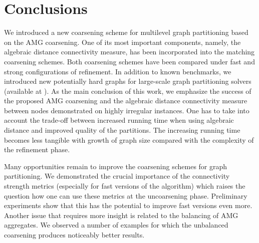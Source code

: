 \documentclass{llncs}
\begin{document}
\section{Conclusions}
We introduced a new coarsening scheme for multilevel graph partitioning based on the AMG coarsening.
One of its most important components, namely, the algebraic distance connectivity measure, has been incorporated into the matching coarsening schemes. 
Both coarsening schemes have been compared under fast and strong configurations of refinement. In addition to known benchmarks, we introduced new potentially hard graphs for large-scale graph partitioning solvers (available at \cite{dimacs10}).
As the main conclusion of this work, we emphasize the success of the proposed AMG coarsening and the algebraic distance connectivity measure between nodes demonstrated on highly irregular instances. One has to take into account the trade-off between increased running time when using algebraic distance and improved quality of the partitions. The increasing running time becomes less tangible with growth of graph size compared with the complexity of the refinement phase.  

Many opportunities remain to improve the coarsening schemes for graph partitioning. We demonstrated the crucial importance of the connectivity strength metrics (especially for fast versions of the algorithm) which raises the question how one can use these metrics at the uncoarsening phase. Preliminary experiments show that this has the potential to improve fast versions even more. 
Another issue that requires more insight is related to the balancing of AMG aggregates. We observed a number of examples for which the unbalanced coarsening produces noticeably better results.

\vfill
\small


\vspace*{1cm}
\end{document}
